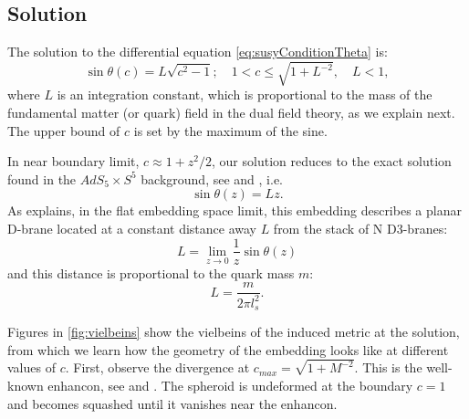 \subsection{Solution}

The solution to the differential equation \eqref{eq:susyConditionTheta} is:
\begin{equation}\label{eq:susyConditionSolution}
\boxed{\sin\theta(c) = L \sqrt{c^2-1}; \quad 1 < c \leq \sqrt{1+L^{-2}}, \quad L < 1},
\end{equation}
where $L$ is an integration constant, which is proportional to the mass of the fundamental matter (or quark) field in the dual field theory, as we explain next. The upper bound of $c$ is set by the maximum of the sine.

In near boundary limit, $c \approx 1 + z^2/2$, our solution reduces to the exact solution found in the $AdS_5 \times S^5$ background, see \cite{Karch:2002sh} and \cite{Karch:2005ms}, i.e.
\begin{equation}
 \sin\theta(z) = L z.
\end{equation}
As \cite{Karch:2005ms} explains, in the flat embedding space limit, this embedding describes a planar D-brane located at a constant distance away $L$ from the stack of N D3-branes:
\begin{equation}
 L = \lim_{z \rightarrow 0 } \frac{1}{z} \sin\theta(z)
\end{equation}
and this distance is proportional to the quark mass $m$:
\begin{equation}
 L = \dfrac{m}{2 \pi l_s^2}.
\end{equation}


Figures in \ref{fig:vielbeins} show the vielbeins of the induced metric at the solution, from which we learn how the geometry of the embedding looks like at different values of $c$. First, observe the divergence at $c_{max}=\sqrt{1+M^{-2}}$. This is the well-known enhancon, see \cite{Buchel:2000cn} and \cite{Evans:2000ct}. The spheroid is undeformed at the boundary $c=1$ and becomes squashed until it vanishes near the enhancon. 

